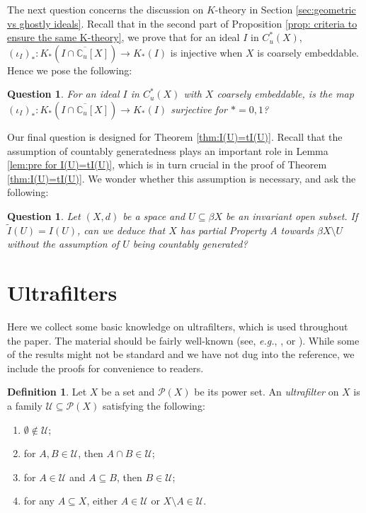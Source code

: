 \documentclass[12pt, a4paper]{amsart}
\numberwithin{equation}{section}
\newtheorem{Q}[thm]{Question}
\theoremstyle{definition}
\newtheorem{defn}[thm]{Definition}
\theoremstyle{remark}
\def\CC{\mathbb{C}}
\def\U{\mathcal{U}}
\def\P{\mathcal{P}}
\begin{document}
The next question concerns the discussion on $K$-theory in Section \ref{sec:geometric vs ghostly ideals}. Recall that in the second part of Proposition \ref{prop: criteria to ensure the same K-theory}, we prove that for an ideal $I$ in $C^*_u(X)$, $(\iota_I)_\ast: K_\ast(\overline{I \cap \CC_u[X]}) \longrightarrow K_\ast(I)$ is injective when $X$ is coarsely embeddable. Hence we pose the following:

\begin{Q}\label{Q2}
For an ideal $I$ in $C^*_u(X)$ with $X$ coarsely embeddable, is the map $(\iota_I)_\ast: K_\ast(\overline{I \cap \CC_u[X]}) \longrightarrow K_\ast(I)$ surjective for $\ast =0,1$?
\end{Q}

Our final question is designed for Theorem \ref{thm:I(U)=tI(U)}. Recall that the assumption of countably generatedness plays an important role in Lemma \ref{lem:pre for I(U)=tI(U)}, which is in turn crucial in the proof of Theorem \ref{thm:I(U)=tI(U)}. We wonder whether this assumption is necessary, and ask the following:

\begin{Q}
Let $(X,d)$ be a space and $U \subseteq \beta X$ be an invariant open subset. If $\tilde{I}(U) = I(U)$, can we deduce that $X$ has partial Property A towards $\beta X \setminus U$ without the assumption of $U$ being countably generated?
\end{Q}



\appendix

\section{Ultrafilters}\label{app:ultrafilters}

Here we collect some basic knowledge on ultrafilters, which is used throughout the paper. The material should be fairly well-known (see, \emph{e.g.}, \cite[Appendix A]{BO08}, \cite[Chapter 7.4]{Roe03} or \cite[Appendix A]{SW17}). While some of the results might not be standard and we have not dug into the reference, we include the proofs for convenience to readers.

\begin{defn}\label{defn:ultrafilter}
Let $X$ be a set and $\P(X)$ be its power set. An \emph{ultrafilter} on $X$ is a family $\U \subseteq \P(X)$ satisfying the following:
\begin{enumerate}
 \item[(I.1)] $\emptyset \notin \U$;
 \item[(I.2)] for $A, B \in \U$, then $A \cap B \in \U$;
 \item[(I.3)] for $A \in \U$ and $A \subseteq B$, then $B \in \U$;
 \item[(I.4)] for any $A \subseteq X$, either $A \in \U$ or $X \setminus A \in \U$.
\end{enumerate}
\end{defn}
\end{document}
